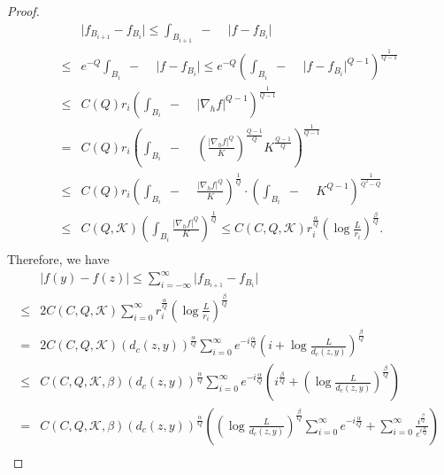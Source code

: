 \documentclass[11pt,twoside]{article}
\theoremstyle{definition}
\theoremstyle{remark}
\begin{document}
\begin{proof}
\begin{equation}
\begin{aligned}
&\vert f_{B_{i+1}}-f_{B_{i}}\vert\leq\int_{B_{i+1}}\!\!\!\!\!\!\!\!\!\!\!\!\!\!\!\!\!\; {}-{} \,\,\,\,\,\,\, \vert f-f_{B_{i}}\vert\\
\leq &e^{-Q}\int_{B_{i}}\!\!\!\!\!\!\!\!\!\!\!\!\; {}-{} \,\,\,\,\,\,\, \vert f-f_{B_{i}}\vert\leq e^{-Q}\left(\int_{B_{i}}\!\!\!\!\!\!\!\!\!\!\!\!\; {}-{} \,\,\,\,\,\,\, \vert f-f_{B_{i}}\vert^{Q-1}\right)^{\frac{1}{Q-1}}\\
\leq& C(Q)r_{i}\left(\int_{B_{i}}\!\!\!\!\!\!\!\!\!\!\!\!\; {}-{} \,\,\,\,\,\,\, \vert \nabla_{h}f\vert^{Q-1}\right)^{\frac{1}{Q-1}}\\
= &C(Q)r_{i}\left(\int_{B_{i}}\!\!\!\!\!\!\!\!\!\!\!\!\; {}-{} \,\,\,\,\,\,\, 
 \left(\frac{\vert\nabla_{h}f\vert^{Q}}{K}\right)^{\frac{Q-1}{Q}}K^{\frac{Q-1}{Q}}\right)^{\frac{1}{Q-1}}\\
\leq &C(Q)r_{i}\left(\int_{B_{i}}\!\!\!\!\!\!\!\!\!\!\!\!\; {}-{} \,\,\,\,\,\,\, \frac{\vert \nabla_{h}f\vert^{Q}}{K}\right)^{\frac{1}{Q}}\cdot\left(\int_{B_{i}}\!\!\!\!\!\!\!\!\!\!\!\!\; {}-{} \,\,\,\,\,\,\,  K^{Q-1}\right)^{\frac{1}{Q^{2}-Q}}\\
\leq& C(Q,\mathcal{K})\left(\int_{B_{i}}\frac{\vert \nabla_{h}f\vert^{Q}}{K}\right)^{\frac{1}{Q}}\leq  C(C, Q,\mathcal{K})r_{i}^{\frac{\alpha}{Q}}\left(\log\frac{L}{r_{i}}\right)^{\frac{\beta}{Q}}.\\
\end{aligned}
\end{equation}
Therefore, we have 
\begin{equation}
\begin{aligned}
&\vert f(y)-f(z)\vert\leq \sum_{i=-\infty}^{\infty}\vert f_{B_{i+1}}-f_{B_{i}}\vert\\
\leq& 2C(C,Q,\mathcal{K})\sum_{i=0}^{\infty}r_{i}^{\frac{\alpha}{Q}}\left(\log\frac{L}{r_{i}}\right)^{\frac{\beta}{Q}}\\
=& 2C(C,Q,\mathcal{K})(d_{c}(z,y))^{\frac{\alpha}{Q}}\sum_{i=0}^{\infty}e^{-i\frac{\alpha}{Q}}\left(i+\log\frac{L}{d_{c}(z,y)}\right)^{\frac{\beta}{Q}}\\
\leq& C(C,Q,\mathcal{K},\beta)(d_{c}(z,y))^{\frac{\alpha}{Q}}\sum_{i=0}^{\infty}e^{-i\frac{\alpha}{Q}}\left(i^{\frac{\beta}{Q}}+\left(\log\frac{L}{d_{c}(z,y)}\right)^{\frac{\beta}{Q}}\right)\\
=& C(C,Q,\mathcal{K},\beta)(d_{c}(z,y))^{\frac{\alpha}{Q}}\left(\left(\log\frac{L}{d_{c}(z,y)}\right)^{\frac{\beta}{Q}}\sum_{i=0}^{\infty}e^{-i\frac{\alpha}{Q}}+\sum_{i=0}^{\infty}\frac{i^{\frac{\beta}{Q}}}{e^{i\frac{\alpha}{Q}}}\right)\\

\end{aligned}
\end{equation}
\end{proof}
\end{document}
